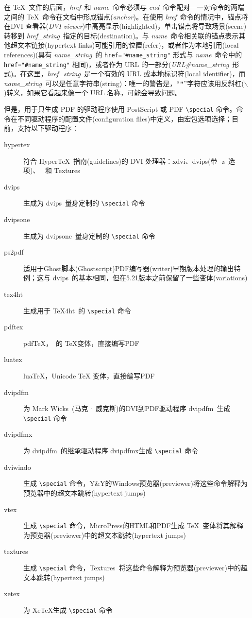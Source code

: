 \documentclass{article}
\begin{document}
在 \TeX\ 文件的后面，\emph{href}\ 和 \emph{name}\ 命令必须与 \emph{end}\ 命令配对---一对命令的两端之间的 \TeX\ 命令在文档中形成{\kaiti 锚点}(\emph{anchor})。在使用 \emph{href}\ 命令的情况中，{\kaiti 锚点}将在{\kaiti DVI 查看器}(\emph{DVI viewer})中高亮显示(highlighted)，单击{\kaiti 锚点}将导致场景(scene)转移到 \emph{href\_string}\ 指定的目标(destination)。与 \emph{name}\ 命令相关联的{\kaiti 锚点}表示其他超文本链接(hypertext links)可能引用的位置(refer)，或者作为本地引用(local references)(具有 \emph{name\_string}\ 的 \verb|href="#name_string"| 形式与 \emph{name}\ 命令中的 \verb|href="#name_string"| 相同)，或者作为 URL 的一部分(\emph{URL\#name\_string}\ 形式)。在这里，\emph{href\_string}\ 是一个有效的 URL 或本地标识符(local identifier)，而 \emph{name\_string}\ 可以是任意字符串(string)：唯一的警告是，“$\verb|"|$”字符应该用反斜杠($\backslash$)转义，如果它看起来像一个 URL 名称，可能会导致问题。

但是，用于{\kaiti 只}生成 PDF 的驱动程序使用 PostScript 或 PDF \verb|\special| 命令。命令在不同驱动程序的配置文件(configuration files)中定义，由宏包选项选择；目前，支持以下驱动程序：

\begin{description}
    \item[hypertex] 符合 Hyper\TeX\ 指南(guidelines)的 DVI 处理器：\textsf{xdvi}、\textsf{dvips}(带 \textsf{-z}\ 选项)、 \textsf{}\ 和 \textsf{Textures}
    \item[dvips] 生成为 \textsf{dvips}\ 量身定制的 \verb|\special| 命令
    \item[dvipsone] 生成为 \textsf{dvipsone}\ 量身定制的 \verb|\special| 命令
    \item[ps2pdf] 适用于Ghost脚本(Ghost\-script)PDF编写器(writer)早期版本处理的输出特例；这与 \textsf{dvips}\ 的基本相同，但在5.21版本之前保留了一些变体(variations)
    \item[tex4ht] 生成用于 \textsf{\TeX4ht}\ 的 \verb|\special| 命令
    \item[pdftex] pdf\TeX，\ 的 \TeX{}变体，直接编写PDF
    \item[luatex] lua\TeX，Unicode \TeX{} 变体，直接编写PDF
    \item[dvipdfm] 为 Mark Wicks~(马克\,·\,威克斯)的DVI到PDF驱动程序 \textsf{dvipdfm}\ 生成 \verb|\special| 命令
    \item[dvipdfmx] 为 \textsf{dvipdfm}\ 的继承驱动程序 \textsf{dvipdfmx}生成 \verb|\special| 命令
    \item[dviwindo] 生成 \verb|\special| 命令，Y\&Y的Windows预览器(previewer)将这些命令解释为预览器中的超文本跳转(hypertext jumps)
    \item[vtex] 生成 \verb|\special| 命令，MicroPress的HTML和PDF生成 \TeX\ 变体将其解释为预览器(previewer)中的超文本跳转(hypertext jumps)
    \item[textures] 生成 \verb|\special| 命令，\textsf{Textures}\ 将这些命令解释为预览器(previewer)中的超文本跳转(hypertext jumps)
    \item[xetex] 为 Xe\TeX{}生成 \verb|\special| 命令
\end{description}
\end{document}
